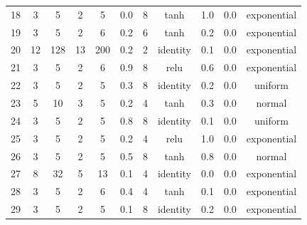 \documentclass[11pt]{article}
\begin{document}
\begin{table}[htbp]
{\begin{tabular}{|c|cccccccccc|}
18 & 3 & 5 & 2 & 5 & 0.0 & 8 & tanh & 1.0 & 0.0 & exponential \\
19 & 3 & 5 & 2 & 6 & 0.2 & 6 & tanh & 0.2 & 0.0 & exponential \\
20 & 12 & 128 & 13 & 200 & 0.2 & 2 & identity & 0.1 & 0.0 & exponential \\
21 & 3 & 5 & 2 & 6 & 0.9 & 8 & relu & 0.6 & 0.0 & exponential \\
22 & 3 & 5 & 2 & 5 & 0.3 & 8 & identity & 0.2 & 0.0 & uniform \\
23 & 5 & 10 & 3 & 5 & 0.2 & 4 & tanh & 0.3 & 0.0 & normal \\
24 & 3 & 5 & 2 & 5 & 0.8 & 8 & identity & 0.1 & 0.0 & uniform \\
25 & 3 & 5 & 2 & 5 & 0.2 & 4 & relu & 1.0 & 0.0 & exponential \\
26 & 3 & 5 & 2 & 5 & 0.5 & 8 & tanh & 0.8 & 0.0 & normal \\
27 & 8 & 32 & 5 & 13 & 0.1 & 4 & identity & 0.0 & 0.0 & exponential \\
28 & 3 & 5 & 2 & 6 & 0.4 & 4 & tanh & 0.1 & 0.0 & exponential \\
29 & 3 & 5 & 2 & 5 & 0.1 & 8 & identity & 0.2 & 0.0 & exponential \\
\hline
\end{tabular}
}
\end{table}
\end{document}
